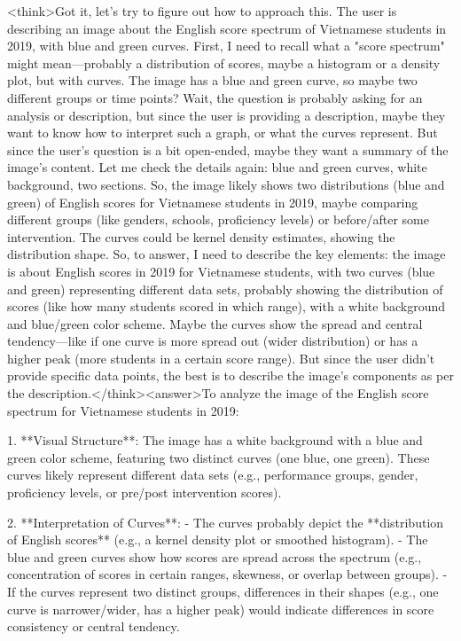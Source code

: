 <think>Got it, let's try to figure out how to approach this. The user is describing an image about the English score spectrum of Vietnamese students in 2019, with blue and green curves. First, I need to recall what a "score spectrum" might mean—probably a distribution of scores, maybe a histogram or a density plot, but with curves. The image has a blue and green curve, so maybe two different groups or time points? Wait, the question is probably asking for an analysis or description, but since the user is providing a description, maybe they want to know how to interpret such a graph, or what the curves represent. But since the user's question is a bit open-ended, maybe they want a summary of the image's content. Let me check the details again: blue and green curves, white background, two sections. So, the image likely shows two distributions (blue and green) of English scores for Vietnamese students in 2019, maybe comparing different groups (like genders, schools, proficiency levels) or before/after some intervention. The curves could be kernel density estimates, showing the distribution shape. So, to answer, I need to describe the key elements: the image is about English scores in 2019 for Vietnamese students, with two curves (blue and green) representing different data sets, probably showing the distribution of scores (like how many students scored in which range), with a white background and blue/green color scheme. Maybe the curves show the spread and central tendency—like if one curve is more spread out (wider distribution) or has a higher peak (more students in a certain score range). But since the user didn't provide specific data points, the best is to describe the image's components as per the description.</think><answer>To analyze the image of the English score spectrum for Vietnamese students in 2019:  

1. **Visual Structure**: The image has a white background with a blue and green color scheme, featuring two distinct curves (one blue, one green). These curves likely represent different data sets (e.g., performance groups, gender, proficiency levels, or pre/post intervention scores).  

2. **Interpretation of Curves**:  
   - The curves probably depict the **distribution of English scores** (e.g., a kernel density plot or smoothed histogram).  
   - The blue and green curves show how scores are spread across the spectrum (e.g., concentration of scores in certain ranges, skewness, or overlap between groups).  
   - If the curves represent two distinct groups, differences in their shapes (e.g., one curve is narrower/wider, has a higher peak) would indicate differences in score consistency or central tendency.  

